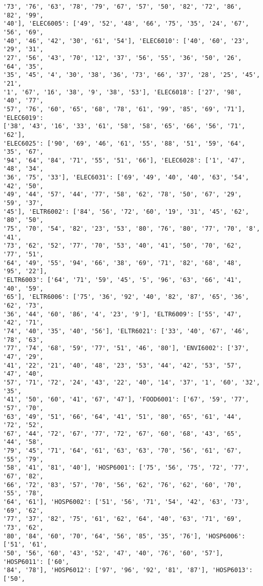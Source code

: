 \documentclass[11pt]{article}
\begin{document}
\begin{Verbatim}[commandchars=\\\{\}]
'73', '76', '63', '78', '79', '67', '57', '50', '82', '72', '86', '82', '99',
'40'], 'ELEC6005': ['49', '52', '48', '66', '75', '35', '24', '67', '56', '69',
'40', '46', '42', '30', '61', '54'], 'ELEC6010': ['40', '60', '23', '29', '31',
'27', '56', '43', '70', '12', '37', '56', '55', '36', '50', '26', '64', '35',
'35', '45', '4', '30', '38', '36', '73', '66', '37', '28', '25', '45', '21',
'1', '67', '16', '38', '9', '38', '53'], 'ELEC6018': ['27', '98', '40', '77',
'57', '76', '60', '65', '68', '78', '61', '99', '85', '69', '71'], 'ELEC6019':
['38', '43', '16', '33', '61', '58', '58', '65', '66', '56', '71', '62'],
'ELEC6025': ['90', '69', '46', '61', '55', '88', '51', '59', '64', '35', '67',
'94', '64', '84', '71', '55', '51', '66'], 'ELEC6028': ['1', '47', '48', '34',
'36', '75', '33'], 'ELEC6031': ['69', '49', '40', '40', '63', '54', '42', '50',
'49', '44', '57', '44', '77', '58', '62', '78', '50', '67', '29', '59', '37',
'45'], 'ELTR6002': ['84', '56', '72', '60', '19', '31', '45', '62', '80', '50',
'75', '70', '54', '82', '23', '53', '80', '76', '80', '77', '70', '8', '41',
'73', '62', '52', '77', '70', '53', '40', '41', '50', '70', '62', '77', '51',
'64', '49', '55', '94', '66', '38', '69', '71', '82', '68', '48', '95', '22'],
'ELTR6003': ['64', '71', '59', '45', '5', '96', '63', '66', '41', '40', '59',
'65'], 'ELTR6006': ['75', '36', '92', '40', '82', '87', '65', '36', '62', '73',
'36', '44', '60', '86', '4', '23', '9'], 'ELTR6009': ['55', '47', '42', '71',
'74', '40', '35', '40', '56'], 'ELTR6021': ['33', '40', '67', '46', '78', '63',
'77', '74', '68', '59', '77', '51', '46', '80'], 'ENVI6002': ['37', '47', '29',
'41', '22', '21', '40', '48', '23', '53', '44', '42', '53', '57', '47', '40',
'57', '71', '72', '24', '43', '22', '40', '14', '37', '1', '60', '32', '35',
'41', '50', '60', '41', '67', '47'], 'FOOD6001': ['67', '59', '77', '57', '70',
'63', '49', '51', '66', '64', '41', '51', '80', '65', '61', '44', '72', '52',
'67', '44', '72', '67', '77', '72', '67', '60', '68', '43', '65', '44', '58',
'79', '45', '71', '64', '61', '63', '63', '70', '56', '61', '67', '55', '79',
'58', '41', '81', '40'], 'HOSP6001': ['75', '56', '75', '72', '77', '67', '82',
'66', '72', '83', '57', '70', '56', '62', '76', '62', '60', '70', '55', '78',
'64', '61'], 'HOSP6002': ['51', '56', '71', '54', '42', '63', '73', '69', '62',
'77', '37', '82', '75', '61', '62', '64', '40', '63', '71', '69', '73', '62',
'80', '84', '60', '70', '64', '56', '85', '35', '76'], 'HOSP6006': ['51', '61',
'50', '56', '60', '43', '52', '47', '40', '76', '60', '57'], 'HOSP6011': ['60',
'84', '78'], 'HOSP6012': ['97', '96', '92', '81', '87'], 'HOSP6013': ['50',

\end{Verbatim}
\end{document}
